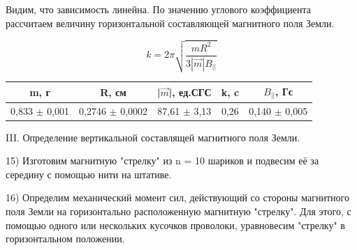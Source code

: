 \documentclass[a4paper,12pt]{article}
\begin{document}

Видим, что зависимость линейна. По значению углового коэффициента рассчитаем величину горизонтальной составляющей магнитного поля Земли.

$$ k = 2\pi\sqrt{\frac{mR^2}{3|\vec{m}|B_{||}}} $$

\begin{center}
\begin{tabular}{|c|c|c|c|c|}
	\hline
	m, г & R, см & |$\vec{m}$|, ед.СГС & k, c & $B_{||}$, Гс \\
	\hline
	0,833 $\pm$ 0,001 & 0,2746 $\pm$ 0,0002 & 87,61 $\pm$ 3,13 & 0,26 & 0,140 $\pm$ 0,005\\
	\hline
\end{tabular}
\end{center}

III. Определение вертикальной составлящей магнитного поля Земли.

15) Изготовим магнитную "стрелку" из n = 10 шариков и подвесим её за середину с помощью нити на штативе.

16) Определим механический момент сил, действующий со стороны магнитного поля Земли на горизонтально расположенную магнитную "стрелку". Для этого, с помощью одного или нескольких кусочков проволоки, уравновесим "стрелку" в горизонтальном положении. 
\end{document}
